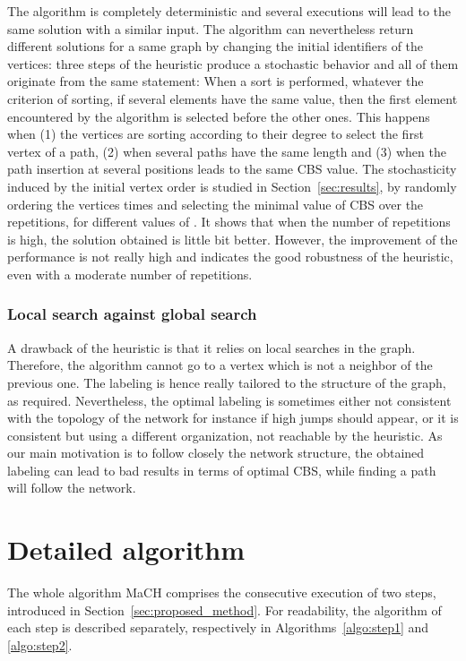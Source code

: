\documentclass{scrartcl}
\theoremstyle{plain}
\newcommand{\algo}{MaCH}
\newcommand{\cbs}{CBS}
\begin{document}
The algorithm is completely deterministic and several executions will lead to 
the same solution with a similar input. The algorithm can nevertheless return 
different solutions for a same graph by changing the initial identifiers of the 
vertices:  three steps of the heuristic produce a stochastic behavior and all of 
them originate from the same statement: When a sort is performed, whatever the 
criterion of sorting, if several elements have the same value, then the first 
element encountered by the algorithm is selected before the other ones. This 
happens when (1) the vertices are sorting according to their degree to select 
the first vertex of a path, (2) when several paths have the same length and (3) 
when the path insertion at several positions leads to the same CBS value. The 
stochasticity induced by the initial vertex order is studied in 
Section~\ref{sec:results}, by randomly ordering the vertices  times and 
selecting the minimal value of \cbs{} over the  repetitions, for different 
values of . It shows that when the number of repetitions is high, the 
solution obtained is little bit better. However, the improvement of the 
performance is not really high and indicates the good robustness of the 
heuristic, even with a moderate number of repetitions.

\subsubsection{Local search against global search}

A drawback of the heuristic is that it relies on local searches in the graph. 
Therefore, the algorithm cannot go to a vertex which is not a neighbor of the 
previous one. The labeling is hence really tailored to the structure of the 
graph, as required. Nevertheless, the optimal labeling is sometimes either not 
consistent with the topology of the network for instance if high jumps should 
appear, or it is consistent but using a different organization, not reachable by 
the heuristic. As our main motivation is to follow closely the network 
structure, the obtained labeling can lead to bad results in terms of optimal 
\cbs{}, while finding a path will follow the network. 
\makeatletter{}\section{Detailed algorithm}
\label{sec:algorithm}

The whole algorithm \algo{} comprises the consecutive execution of two steps, 
introduced in Section~\ref{sec:proposed_method}. For readability, the 
algorithm of each step is described separately, respectively in 
Algorithms~\ref{algo:step1} and \ref{algo:step2}. 
\end{document}
